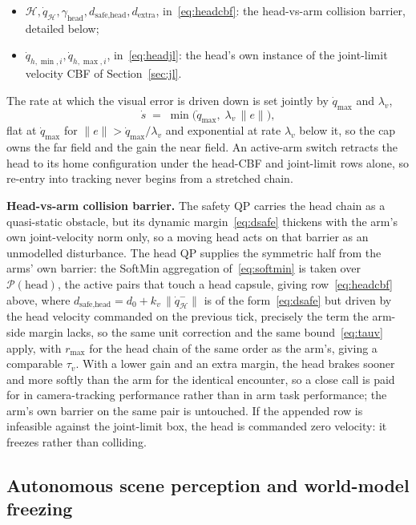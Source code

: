 \documentclass[12pt,a4paper,twoside,openright]{report}
\newcommand{\qdot}{\dot{q}}
\begin{document}
\begin{itemize}[nosep]
\item $\mathcal{H}, \qdot_{\mathcal{H}}, \gamma_{\text{head}}, d_{\text{safe},\text{head}}, d_{\text{extra}}$, in~\eqref{eq:headcbf}: the head-vs-arm collision barrier, detailed below;
\item $\qdot_{h,\min,i}, \qdot_{h,\max,i}$, in~\eqref{eq:headjl}: the head's own instance of the joint-limit velocity CBF of Section~\ref{sec:jl}.
\end{itemize}
The rate at which the visual error is driven down is set jointly by $\qdot_{\max}$ and $\lambda_v$,
\begin{equation}
\dot{s} \;=\; \min\!\bigl(\qdot_{\max},\; \lambda_v\,\|e\|\bigr),
\label{eq:headvel}
\end{equation}
flat at $\qdot_{\max}$ for $\|e\| > \qdot_{\max}/\lambda_v$ and exponential at rate $\lambda_v$ below it, so the cap owns the far field and the gain the near field. An active-arm switch retracts the head to its home configuration under the head-CBF and joint-limit rows alone, so re-entry into tracking never begins from a stretched chain.

\textbf{Head-vs-arm collision barrier.} The safety QP carries the head chain as a quasi-static obstacle, but its dynamic margin~\eqref{eq:dsafe} thickens with the arm's own joint-velocity norm only, so a moving head acts on that barrier as an unmodelled disturbance. The head QP supplies the symmetric half from the arms' own barrier: the SoftMin aggregation of~\eqref{eq:softmin} is taken over $\mathcal{P}(\text{head})$, the active pairs that touch a head capsule, giving row~\eqref{eq:headcbf} above, where $d_{\text{safe},\text{head}} = d_0 + k_v\,\|\qdot_{\mathcal{H}}^{-}\|$ is of the form~\eqref{eq:dsafe} but driven by the head velocity commanded on the previous tick, precisely the term the arm-side margin lacks, so the same unit correction and the same bound~\eqref{eq:tauv} apply, with $r_{\max}$ for the head chain of the same order as the arm's, giving a comparable $\tau_v$. With a lower gain and an extra margin, the head brakes sooner and more softly than the arm for the identical encounter, so a close call is paid for in camera-tracking performance rather than in arm task performance; the arm's own barrier on the same pair is untouched. If the appended row is infeasible against the joint-limit box, the head is commanded zero velocity: it freezes rather than colliding.

\subsection{Autonomous scene perception and world-model freezing}
\label{sec:convergence}
\end{document}
